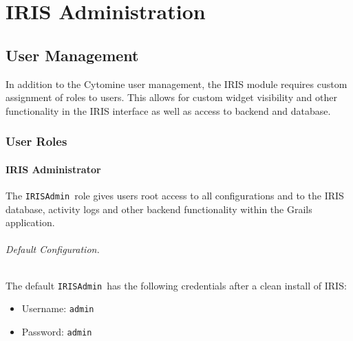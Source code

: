 \part{IRIS Administration}
\label{part:irisadmin}
{
\hypersetup{linkcolor=black}
\parttoc
}

\chapter{User Management}
In addition to the Cytomine user management, the IRIS module requires custom assignment of roles to users. 
This allows for custom widget visibility and other functionality in the IRIS interface as well as access to backend and database. 

\def\irisadmin{\texttt{IRISAdmin}}
\def\pjcoord{\texttt{ProjectCoordinator}}
\section{User Roles}
\subsection{IRIS Administrator}
The \irisadmin\ role gives users root access to all configurations and to the IRIS database, activity logs and other backend functionality within the Grails application.  

\noindent 

\paragraph{Default Configuration.} 
The default \irisadmin\ has the following credentials after a clean install of IRIS:
\begin{itemize}
\item Username: \texttt{admin}
\item Password: \texttt{admin}
\end{itemize}


